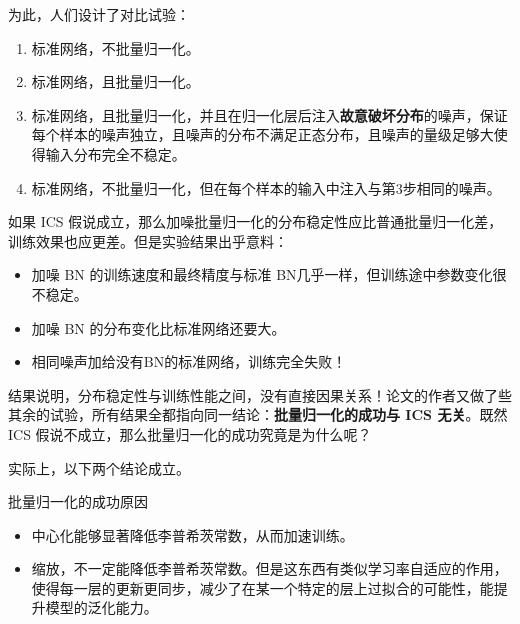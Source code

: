 为此，人们设计了对比试验\cite{santurkar2019doesbatchnormalizationhelp}：
\begin{enumerate}
    \item 标准网络，不批量归一化。
    \item 标准网络，且批量归一化。
    \item 标准网络，且批量归一化，并且在归一化层后注入\textbf{故意破坏分布}的噪声，保证每个样本的噪声独立，且噪声的分布不满足正态分布，且噪声的量级足够大使得输入分布完全不稳定。
    \item 标准网络，不批量归一化，但在每个样本的输入中注入与第3步相同的噪声。
\end{enumerate}
如果 ICS 假说成立，那么加噪批量归一化的分布稳定性应比普通批量归一化差，训练效果也应更差。但是实验结果出乎意料：
\begin{itemize}
    \item 加噪 BN 的训练速度和最终精度与标准 BN几乎一样，但训练途中参数变化很不稳定。
    \item 加噪 BN 的分布变化比标准网络还要大。
    \item 相同噪声加给没有BN的标准网络，训练完全失败！
\end{itemize}
结果说明，分布稳定性与训练性能之间，没有直接因果关系\cite{santurkar2019doesbatchnormalizationhelp}！论文的作者又做了些其余的试验，所有结果全都指向同一结论：\textbf{批量归一化的成功与 ICS 无关}。既然 ICS 假说不成立，那么批量归一化的成功究竟是为什么呢？

实际上，以下两个结论成立。

\begin{theorem}{批量归一化的成功原因}{}
\begin{itemize}
    \item 中心化能够显著降低李普希茨常数，从而加速训练。
    \item 缩放，不一定能降低李普希茨常数。但是这东西有类似学习率自适应的作用，使得每一层的更新更同步，减少了在某一个特定的层上过拟合的可能性，能提升模型的泛化能力\cite{kexuefm-6992}。
\end{itemize}
\end{theorem}

